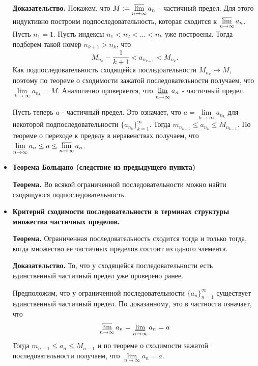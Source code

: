 \documentclass[12pt,a4paper]{article}
\begin{document}
\begin{itemize}
\textbf{Доказательство.} Покажем, что $M := \varlimsup\limits_{n \to \infty}{a_n}$ - частичный предел. Для этого индуктивно построим подпоследовательность, которая сходится к $\varlimsup\limits_{n \to \infty}{a_n}$. Пусть $n_1 = 1$. Пусть индексы $n_1 < n_2 < \ldots < n_k$ уже построены. Тогда подберем такой номер $n_{k+1} > n_k$, что 
\[
M_{n_k} - \frac{1}{k+1} < 
a_{n_{k+1}} < 
M_{n_k}.
\]
Как подпоследовательность сходящейся последоательности $M_{n_k} \to M$, поэтому по теореме о сходимости зажатой последовательности получаем, что $\lim\limits_{k \to \infty}{a_{n_k}} = M$. Аналогично проверяется, что $\varliminf\limits_{n \to \infty}{a_n}$ - частичный предел.

Пусть теперь $a$ - частичный предел. Это означает, что $a = \lim\limits_{k \to \infty}{a_{n_k}}$ для некоторой подпоследовательности $\{a_{n_k}\}_{k=1}^\infty$. Тогда $m_{n_{k-1}} \leq a_{n_k} \leq M_{n_{k-1}}$. По теореме о переходе к пределу в неравенствах получаем, что $\varliminf\limits_{n \to \infty}{a_n} \leq a \leq \varlimsup\limits_{n \to \infty}{a_n}$.

\item \textbf{Теорема Больцано (следствие из предыдущего пункта)} 

\textbf{Теорема.} 
Во всякой ограниченной последовательности можно найти сходящуюся подпоследовательность.

\item \textbf{Критерий сходимости последовательности в терминах структуры множества частичных пределов.}

\textbf{Теорема.} Ограниченная последовательность сходится тогда и только тогда, когда множество ее частичных пределов состоит из одного элемента.

\textbf{Доказательство.} То, что у сходящейся последовательности есть единственный частичный предел уже проверено ранее.

Предположим, что у ограниченной последовательности $\{a_n\}_{n=1}^\infty$ существует единственный частичный предел. По доказанному, это в частности означает, что 
\[
\varlimsup_{n \to \infty}{a_n} = 
\varliminf_{n \to \infty}{a_n} = 
a
\]
Тогда $m_{n-1} \leq a_n \leq M_{n-1}$ и по теореме о сходимости зажатой последовательности получаем, что $\lim\limits_{n \to \infty}{a_n} = a$.
\end{itemize}
\end{document}
